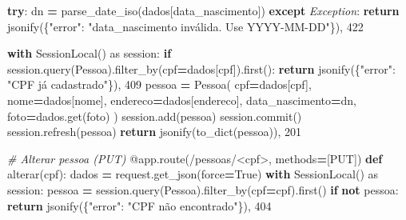 \documentclass[
]{book}
\newenvironment{Shaded}{\begin{snugshade}}{\end{snugshade}}
\newcommand{\AttributeTok}[1]{\textcolor[rgb]{0.13,0.29,0.53}{#1}}
\newcommand{\CommentTok}[1]{\textcolor[rgb]{0.56,0.35,0.01}{\textit{#1}}}
\newcommand{\ControlFlowTok}[1]{\textcolor[rgb]{0.13,0.29,0.53}{\textbf{#1}}}
\newcommand{\DecValTok}[1]{\textcolor[rgb]{0.00,0.00,0.81}{#1}}
\newcommand{\ImportTok}[1]{#1}
\newcommand{\KeywordTok}[1]{\textcolor[rgb]{0.13,0.29,0.53}{\textbf{#1}}}
\newcommand{\NormalTok}[1]{#1}
\newcommand{\OperatorTok}[1]{\textcolor[rgb]{0.81,0.36,0.00}{\textbf{#1}}}
\newcommand{\PreprocessorTok}[1]{\textcolor[rgb]{0.56,0.35,0.01}{\textit{#1}}}
\newcommand{\StringTok}[1]{\textcolor[rgb]{0.31,0.60,0.02}{#1}}
\newcommand{\VariableTok}[1]{\textcolor[rgb]{0.00,0.00,0.00}{#1}}
\begin{document}
\begin{Shaded}
\begin{Highlighting}[]
    \ControlFlowTok{try}\NormalTok{:}
\NormalTok{        dn }\OperatorTok{=}\NormalTok{ parse\_date\_iso(dados[}\StringTok{\textquotesingle{}data\_nascimento\textquotesingle{}}\NormalTok{])}
    \ControlFlowTok{except} \PreprocessorTok{Exception}\NormalTok{:}
        \ControlFlowTok{return}\NormalTok{ jsonify(\{}\StringTok{"error"}\NormalTok{: }\StringTok{"data\_nascimento inválida. Use YYYY{-}MM{-}DD"}\NormalTok{\}), }\DecValTok{422}

    \ControlFlowTok{with}\NormalTok{ SessionLocal() }\ImportTok{as}\NormalTok{ session:}
        \ControlFlowTok{if}\NormalTok{ session.query(Pessoa).filter\_by(cpf}\OperatorTok{=}\NormalTok{dados[}\StringTok{\textquotesingle{}cpf\textquotesingle{}}\NormalTok{]).first():}
            \ControlFlowTok{return}\NormalTok{ jsonify(\{}\StringTok{"error"}\NormalTok{: }\StringTok{"CPF já cadastrado"}\NormalTok{\}), }\DecValTok{409}
\NormalTok{        pessoa }\OperatorTok{=}\NormalTok{ Pessoa(}
\NormalTok{            cpf}\OperatorTok{=}\NormalTok{dados[}\StringTok{\textquotesingle{}cpf\textquotesingle{}}\NormalTok{],}
\NormalTok{            nome}\OperatorTok{=}\NormalTok{dados[}\StringTok{\textquotesingle{}nome\textquotesingle{}}\NormalTok{],}
\NormalTok{            endereco}\OperatorTok{=}\NormalTok{dados[}\StringTok{\textquotesingle{}endereco\textquotesingle{}}\NormalTok{],}
\NormalTok{            data\_nascimento}\OperatorTok{=}\NormalTok{dn,}
\NormalTok{            foto}\OperatorTok{=}\NormalTok{dados.get(}\StringTok{\textquotesingle{}foto\textquotesingle{}}\NormalTok{)}
\NormalTok{        )}
\NormalTok{        session.add(pessoa)}
\NormalTok{        session.commit()}
\NormalTok{        session.refresh(pessoa)}
        \ControlFlowTok{return}\NormalTok{ jsonify(to\_dict(pessoa)), }\DecValTok{201}

\CommentTok{\# Alterar pessoa (PUT)}
\AttributeTok{@app.route}\NormalTok{(}\StringTok{\textquotesingle{}/pessoas/\textless{}cpf\textgreater{}\textquotesingle{}}\NormalTok{, methods}\OperatorTok{=}\NormalTok{[}\StringTok{\textquotesingle{}PUT\textquotesingle{}}\NormalTok{])}
\KeywordTok{def}\NormalTok{ alterar(cpf):}
\NormalTok{    dados }\OperatorTok{=}\NormalTok{ request.get\_json(force}\OperatorTok{=}\VariableTok{True}\NormalTok{)}
    \ControlFlowTok{with}\NormalTok{ SessionLocal() }\ImportTok{as}\NormalTok{ session:}
\NormalTok{        pessoa }\OperatorTok{=}\NormalTok{ session.query(Pessoa).filter\_by(cpf}\OperatorTok{=}\NormalTok{cpf).first()}
        \ControlFlowTok{if} \KeywordTok{not}\NormalTok{ pessoa:}
            \ControlFlowTok{return}\NormalTok{ jsonify(\{}\StringTok{"error"}\NormalTok{: }\StringTok{"CPF não encontrado"}\NormalTok{\}), }\DecValTok{404}


\end{Highlighting}
\end{Shaded}
\end{document}
